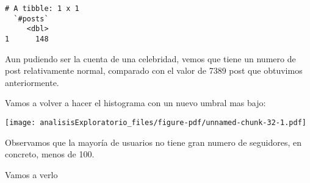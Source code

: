 \documentclass[
  letterpaper,
  DIV=11,
  numbers=noendperiod]{scrreprt}
\newenvironment{Shaded}{\begin{snugshade}}{\end{snugshade}}
\newcommand{\AttributeTok}[1]{\textcolor[rgb]{0.40,0.45,0.13}{#1}}
\newcommand{\DecValTok}[1]{\textcolor[rgb]{0.68,0.00,0.00}{#1}}
\newcommand{\FunctionTok}[1]{\textcolor[rgb]{0.28,0.35,0.67}{#1}}
\newcommand{\NormalTok}[1]{\textcolor[rgb]{0.00,0.23,0.31}{#1}}
\newcommand{\OtherTok}[1]{\textcolor[rgb]{0.00,0.23,0.31}{#1}}
\newcommand{\SpecialCharTok}[1]{\textcolor[rgb]{0.37,0.37,0.37}{#1}}
\newcommand{\StringTok}[1]{\textcolor[rgb]{0.13,0.47,0.30}{#1}}
\begin{document}
\begin{verbatim}
# A tibble: 1 x 1
  `#posts`
     <dbl>
1      148
\end{verbatim}

Aun pudiendo ser la cuenta de una celebridad, vemos que tiene un numero
de post relativamente normal, comparado con el valor de 7389 post que
obtuvimos anteriormente.

Vamos a volver a hacer el histograma con un nuevo umbral mas bajo:

\begin{Shaded}
\end{Shaded}

\texttt{[image: analisisExploratorio\_files/figure-pdf/unnamed-chunk-32-1.pdf]}

Observamos que la mayoría de usuarios no tiene gran numero de
seguidores, en concreto, menos de 100.

Vamos a verlo

\begin{Shaded}
\end{Shaded}
\end{document}
